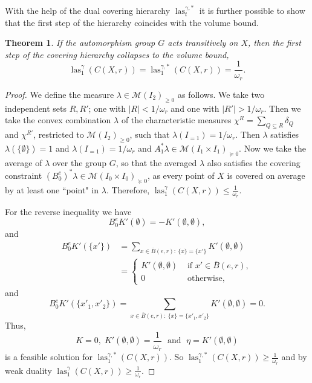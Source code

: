 \documentclass{amsart}
\newtheorem{theorem}[defin]{Theorem}
\DeclareMathOperator{\las}{las}
\begin{document}
With the help of the dual covering hierarchy $\las_t^{\gamma,*}$ it is
further possible to show that the first step of the hierarchy
coincides with the volume bound.

\begin{theorem}
\label{thm:first-step-volume-bound}
  If the automorphism group $G$ acts transitively on $X$, then the first
  step of the covering hierarchy collapses to the volume bound,
  \[
    \las^{\gamma}_1(C(X,r))=\las^{\gamma,*}_1(C(X,r))=\frac{1}{\omega_r}.
  \]
\end{theorem}

\begin{proof}
  We define the measure $\lambda\in \mathcal{M}(I_2)_{\geq 0}$ as follows.
  We take two independent sets $R, R'$; one with $|R| < 1/\omega_r$ and one with $|R'| > 1/\omega_r$.
  Then we take the convex combination $\lambda$ of the characteristic measures $\chi^R =  \sum_{Q \subseteq R} \delta_Q$ and $\chi^{R'}$, restricted to  $\mathcal{M}(I_2)_{\geq 0}$,
  such that $\lambda(I_{=1}) = 1/\omega_r$. Then $\lambda$  satisfies $\lambda(\{\emptyset\}) = 1$ and $\lambda(I_{=1}) = 1/\omega_r$ and $A_1^* \lambda \in \mathcal{M}(I_1 \times I_1)_{\succeq 0}$.
  Now we take the average of $\lambda$ over the group $G$, so that the averaged $\lambda$ also satisfies the covering constraint 
  $(B_0^e)^* \lambda \in \mathcal{M}(I_0 \times I_0)_{\succeq 0}$, as every point of $X$ is covered on average by at least one ``point" in $\lambda$. Therefore, $\las^{\gamma}_1(C(X,r))\leq \frac{1}{\omega_r}$.

For the reverse inequality we have
\[
  B_0^e K'(\emptyset)=-K'(\emptyset,\emptyset),
\]
and
\begin{align*}
	B_0^e K'\left(\{x'\}\right)& = \sum_{x\in \overline{B}(e,r):\ \{x\}= \{x'\} } K'(\emptyset,\emptyset) \\
                                  & =
\begin{cases}
  K'(\emptyset,\emptyset) & \text{ if } x' \in \overline{B}(e,r),\\
  0 & \text{ otherwise,}
  \end{cases}
\end{align*}
and
\[
  B_0^e K'\left(\{x'_1,x'_2\}\right) =\sum_{x\in
    \overline{B}(e,r):\ \{x\}= \{x'_1,x'_2\} } K'(\emptyset,\emptyset)
= 0.
\]  
Thus,
\[
  K=0, \; K'(\emptyset,\emptyset)=\frac{1}{\omega_r} \; \text{ and } \;
  \eta=K'(\emptyset,\emptyset)
\]
is a feasible solution for $\las_1^{\gamma, *}(C(X,r))$. So
$\las^{\gamma,*}_1(C(X,r)) \geq \frac{1}{\omega_r}$ and by weak
duality $\las^{\gamma}_1(C(X,r)) \geq \frac{1}{\omega_r}$.
\end{proof}
\end{document}
